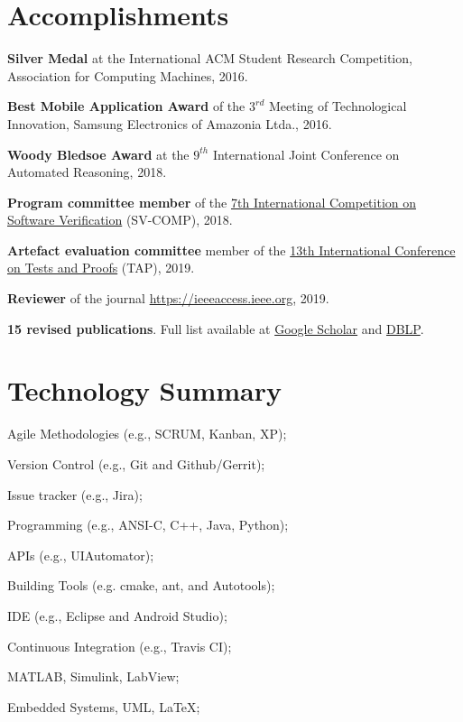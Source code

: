 \documentclass[letterpaper]{article}
\renewenvironment{itemize}{
  \begin{list}{}{
    \setlength{\leftmargin}{1.5em}
  }
}{
  \end{list}
}
\begin{document}
\section*{Accomplishments}
\begin{itemize}
  \item {\bf Silver Medal} at the International ACM Student Research Competition, Association for Computing Machines, 2016.

  \item {\bf Best Mobile Application Award} of the $3^{rd}$ Meeting of Technological Innovation, Samsung Electronics of Amazonia Ltda., 2016.
  
  \item {\bf Woody Bledsoe Award} at the $9^{th}$ International Joint Conference on Automated Reasoning, 2018.
  
  \item {\bf Program committee member} of the \href{https://sv-comp.sosy-lab.org/2018/committee.php}{7th International Competition on Software Verification} (SV-COMP), 2018.
  
  \item {\bf Artefact evaluation committee} member of the \href{https://tap.sosy-lab.org/2019/committee.php}{13th International Conference on Tests and Proofs} (TAP), 2019.
  
  \item {\bf Reviewer} of the journal \href{IEEE Access}{https://ieeeaccess.ieee.org}, 2019.

  \item {\bf 15 revised publications}. Full list available at \href{https://scholar.google.com/citations?hl=en&user=6bNQcz0AAAAJ}{Google Scholar} and \href{https://dblp.uni-trier.de/pers/hd/m/Monteiro:Felipe_R=}{DBLP}.
\end{itemize}

\section*{Technology Summary}
   \begin{itemize}
   \item{Agile Methodologies (e.g., SCRUM, Kanban, XP);}
   \item{Version Control (e.g., Git and Github/Gerrit);}
   \item{Issue tracker (e.g., Jira);}
   \item{Programming (e.g., ANSI-C, C++, Java, Python);}
   \item{APIs (e.g., UIAutomator);}
   \item{Building Tools (e.g. cmake, ant, and Autotools);}
   \item{IDE (e.g., Eclipse and Android Studio);}
   \item{Continuous Integration (e.g., Travis CI);}
   \item{MATLAB, Simulink, LabView;}
   \item{Embedded Systems, UML, \LaTeX;}
   \end{itemize}
   
\end{document}
